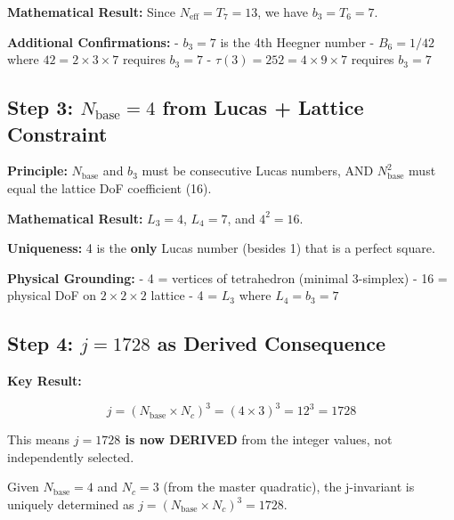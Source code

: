 \documentclass[
  11pt,
  letterpaper,
  twoside,
  openany]{book}
\makeatletter
\let\orig@subsection\subsection
\renewcommand{\subsection}{\needspace{6\baselineskip}\orig@subsection}
\makeatother
\begin{document}
\textbf{Mathematical Result:} Since \(N_{\text{eff}} = T_7 = 13\), we
have \(b_3 = T_6 = 7\).

\textbf{Additional Confirmations:} - \(b_3 = 7\) is the 4th Heegner
number - \(B_6 = 1/42\) where \(42 = 2 \times 3 \times 7\) requires
\(b_3 = 7\) - \(\tau(3) = 252 = 4 \times 9 \times 7\) requires
\(b_3 = 7\)

\subsection{\texorpdfstring{Step 3: \(N_{\text{base}} = 4\) from Lucas +
Lattice
Constraint}{Step 3: N\_\{\textbackslash text\{base\}\} = 4 from Lucas + Lattice Constraint}}\label{step-3-n_textbase-4-from-lucas-lattice-constraint}

\textbf{Principle:} \(N_{\text{base}}\) and \(b_3\) must be consecutive
Lucas numbers, AND \(N_{\text{base}}^2\) must equal the lattice DoF
coefficient (16).

\textbf{Mathematical Result:} \(L_3 = 4\), \(L_4 = 7\), and
\(4^2 = 16\).

\textbf{Uniqueness:} 4 is the \textbf{only} Lucas number (besides 1)
that is a perfect square.

\textbf{Physical Grounding:} - 4 = vertices of tetrahedron (minimal
3-simplex) - 16 = physical DoF on \(2 \times 2 \times 2\) lattice - 4 =
\(L_3\) where \(L_4 = b_3 = 7\)

\subsection{\texorpdfstring{Step 4: \(j = 1728\) as Derived
Consequence}{Step 4: j = 1728 as Derived Consequence}}\label{step-4-j-1728-as-derived-consequence}

\textbf{Key Result:}

\[\boxed{j = (N_{\text{base}} \times N_c)^3 = (4 \times 3)^3 = 12^3 = 1728}\]

This means \textbf{\(j = 1728\) is now DERIVED} from the integer values,
not independently selected.

\begin{tcolorbox}[enhanced jigsaw, colbacktitle=quarto-callout-important-color!10!white, titlerule=0mm, bottomtitle=1mm, bottomrule=.15mm, colback=white, arc=.35mm, breakable, toprule=.15mm, title=\textcolor{quarto-callout-important-color}{\faExclamation}\hspace{0.5em}{Theorem NTHR-1}, rightrule=.15mm, coltitle=black, leftrule=.75mm, colframe=quarto-callout-important-color-frame, toptitle=1mm, opacityback=0, opacitybacktitle=0.6, left=2mm]

Given \(N_{\text{base}} = 4\) and \(N_c = 3\) (from the master
quadratic), the j-invariant is uniquely determined as
\(j = (N_{\text{base}} \times N_c)^3 = 1728\).

\end{tcolorbox}
\end{document}
